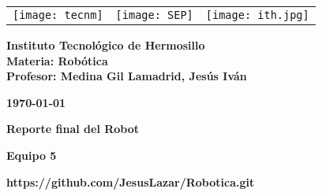 \begin{titlepage}
	\centering
	\begin{tabular}{@{}p{} p{} p{}@{}}
		\texttt{[image: tecnm]} & 
		\centering \texttt{[image: SEP]} & 
		\raggedleft \texttt{[image: ith.jpg]} \\
	\end{tabular}
	
	\vspace{2em}
	
	\noindent
	\begin{minipage}[t]{0.6\textwidth}
		\raggedright
		\small \textbf{%
			Instituto Tecnológico de Hermosillo\\
			Materia: Robótica\\
			Profesor: Medina Gil Lamadrid, Jesús Iván%
		}
	\end{minipage}%
	\hfill
	\begin{minipage}[t]{0.3\textwidth}
		\raggedleft
		\small \textbf{\today}
	\end{minipage}
	
	\vspace{2em}
	
	{\Huge \textbf{Reporte final del Robot}}
		
	\vspace{1em}
	
	\begin{center}
		{\Large \textbf{Equipo 5}}
		
		{\small \textbf{https://github.com/JesusLazar/Robotica.git}}
	\end{center}
	
	\vspace{1em}
	

\end{titlepage}
